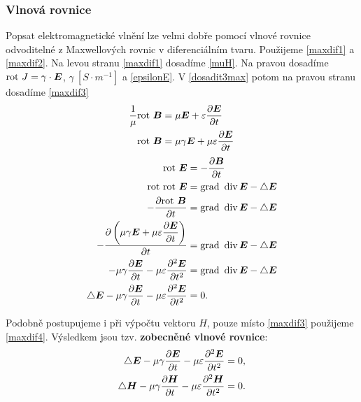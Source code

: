\documentclass[12pt,a4paper,oneside]{article}
\numberwithin{equation}{section} %
\numberwithin{figure}{section} %
\numberwithin{table}{section} %
\renewcommand{\vec}[1]{\mbox{\boldmath$#1$}} %
\newcommand{\grad}{\mathrm{grad}\ }
\newcommand{\rot}{\mathrm{rot}\ }
\begin{document}
\subsubsection*{Vlnová rovnice}
Popsat elektromagnetické vlnění lze velmi dobře pomocí vlnové rovnice odvoditelné z Maxwellových rovnic v diferenciálním tvaru. Použijeme \ref{maxdif1} a \ref{maxdif2}. Na levou stranu \ref{maxdif1} dosadíme \ref{muH}. Na pravou dosadíme $\rot{J} = \gamma \cdot \vec{E}$, $\gamma ~[S \cdot m^{-1}]$ a \ref{epsilonE}. V \ref{dosadit3max} potom na pravou stranu dosadíme \ref{maxdif3}
\begin{subequations}
\begin{align}
\frac{1}{\mu} \rot \vec{B} &= \mu \vec{E} + \varepsilon \frac{\partial \vec{E}}{\partial t}
\\
\rot \vec{B} &= \mu \gamma \vec{E} + \mu \varepsilon \frac{\partial \vec{E}}{\partial t}
\end{align}
\end{subequations}
\begin{subequations}
\begin{align}
\rot \vec{E} &= - \frac{\partial \vec{B}}{\partial t}
\\
\rot \rot \vec{E} &= \grad \udiv \vec{E} - \triangle \vec{E}
\\
- \frac{\partial \rot \vec{B}}{\partial t} &= \grad \udiv \vec{E} - \triangle \vec{E}
\\
- \frac{\partial \left( \mu \gamma \vec{E} + \mu \varepsilon \dfrac{\partial \vec{E}}{\partial t} \right) }{\partial t} &= \grad \udiv \vec{E} - \triangle \vec{E}
\\
\label{dosadit3max}
- \mu \gamma \frac{\partial \vec{E}}{\partial t} - \mu \varepsilon \frac{\partial ^2 \vec{E}}{\partial t ^2} &= \grad \udiv \vec{E} - \triangle \vec{E}
\\
\triangle \vec{E} - \mu \gamma \frac{\partial \vec{E}}{\partial t} - \mu \varepsilon \frac{\partial ^2 \vec{E}}{\partial t ^2} &= 0.
\end{align}
\end{subequations}

Podobně postupujeme i při výpočtu vektoru $H$, pouze místo \ref{maxdif3} použijeme \ref{maxdif4}. Výsledkem jsou tzv. \textbf{zobecněné vlnové rovnice}:
\begin{subequations}
\label{vlnovka}
\begin{align}
\triangle \vec{E} - \mu \gamma \frac{\partial \vec{E}}{\partial t} - \mu \varepsilon \frac{\partial ^2 \vec{E}}{\partial t ^2} &= 0,
\\
\triangle \vec{H} - \mu \gamma \frac{\partial \vec{H}}{\partial t} - \mu \varepsilon \frac{\partial ^2 \vec{H}}{\partial t ^2} &= 0.
\end{align}
\end{subequations}
\end{document}
